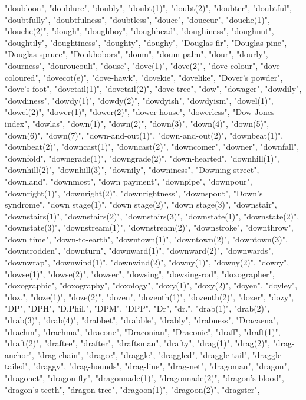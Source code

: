 "doubloon",
"doublure",
"doubly",
"doubt(1)",
"doubt(2)",
"doubter",
"doubtful",
"doubtfully",
"doubtfulness",
"doubtless",
"douce",
"douceur",
"douche(1)",
"douche(2)",
"dough",
"doughboy",
"doughhead",
"doughiness",
"doughnut",
"doughtily",
"doughtiness",
"doughty",
"doughy",
"Douglas fir",
"Douglas pine",
"Douglas spruce",
"Doukhobors",
"doum",
"doum-palm",
"dour",
"dourly",
"dourness",
"douroucouli",
"douse",
"dove(1)",
"dove(2)",
"dove-colour",
"dove-coloured",
"dovecot(e)",
"dove-hawk",
"dovekie",
"dovelike",
"Dover's powder",
"dove's-foot",
"dovetail(1)",
"dovetail(2)",
"dove-tree",
"dow",
"dowager",
"dowdily",
"dowdiness",
"dowdy(1)",
"dowdy(2)",
"dowdyish",
"dowdyism",
"dowel(1)",
"dowel(2)",
"dower(1)",
"dower(2)",
"dower house",
"dowerless",
"Dow-Jones index",
"dowlas",
"down(1)",
"down(2)",
"down(3)",
"down(4)",
"down(5)",
"down(6)",
"down(7)",
"down-and-out(1)",
"down-and-out(2)",
"downbeat(1)",
"downbeat(2)",
"downcast(1)",
"downcast(2)",
"downcomer",
"downer",
"downfall",
"downfold",
"downgrade(1)",
"downgrade(2)",
"down-hearted",
"downhill(1)",
"downhill(2)",
"downhill(3)",
"downily",
"downiness",
"Downing street",
"downland",
"downmost",
"down payment",
"downpipe",
"downpour",
"downright(1)",
"downright(2)",
"downrightness",
"downspout",
"Down's syndrome",
"down stage(1)",
"down stage(2)",
"down stage(3)",
"downstair",
"downstairs(1)",
"downstairs(2)",
"downstairs(3)",
"downstate(1)",
"downstate(2)",
"downstate(3)",
"downstream(1)",
"downstream(2)",
"downstroke",
"downthrow",
"down time",
"down-to-earth",
"downtown(1)",
"downtown(2)",
"downtown(3)",
"downtrodden",
"downturn",
"downward(1)",
"downward(2)",
"downwards",
"downwrap",
"downwind(1)",
"downwind(2)",
"downy(1)",
"downy(2)",
"dowry",
"dowse(1)",
"dowse(2)",
"dowser",
"dowsing",
"dowsing-rod",
"doxographer",
"doxographic",
"doxography",
"doxology",
"doxy(1)",
"doxy(2)",
"doyen",
"doyley",
"doz.",
"doze(1)",
"doze(2)",
"dozen",
"dozenth(1)",
"dozenth(2)",
"dozer",
"dozy",
"DP",
"DPH",
"D.Phil.",
"DPM",
"DPP",
"Dr",
"dr.",
"drab(1)",
"drab(2)",
"drab(3)",
"drab(4)",
"drabbet",
"drabble",
"drably",
"drabness",
"Dracaena",
"drachm",
"drachma",
"dracone",
"Draconian",
"Draconic",
"draff",
"draft(1)",
"draft(2)",
"draftee",
"drafter",
"draftsman",
"drafty",
"drag(1)",
"drag(2)",
"drag-anchor",
"drag chain",
"dragee",
"draggle",
"draggled",
"draggle-tail",
"draggle-tailed",
"draggy",
"drag-hounds",
"drag-line",
"drag-net",
"dragoman",
"dragon",
"dragonet",
"dragon-fly",
"dragonnade(1)",
"dragonnade(2)",
"dragon's blood",
"dragon's teeth",
"dragon-tree",
"dragoon(1)",
"dragoon(2)",
"dragster",
